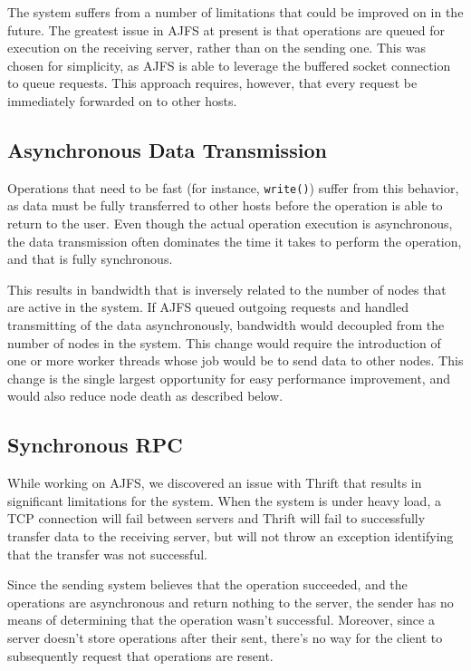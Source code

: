 
The system suffers from a number of limitations that could be improved on in the
future. The greatest issue in AJFS at present is that operations are queued for
execution on the receiving server, rather than on the sending one. This was
chosen for simplicity, as AJFS is able to leverage the buffered socket
connection to queue requests. This approach requires, however, that every
request be immediately forwarded on to other hosts.

\subsection{Asynchronous Data Transmission}

Operations that need to be fast (for instance, \texttt{write()}) suffer from
this behavior, as data must  be fully transferred to other hosts before the
operation is able to return to the user. Even though the actual operation
execution is asynchronous, the data transmission often dominates the time it
takes to perform the operation, and that is fully synchronous.

This results in bandwidth that is inversely related to the number of nodes
that are active in the system. If AJFS queued outgoing requests and handled
transmitting of the data asynchronously, bandwidth would decoupled from the 
number of nodes in the system. This change would require the introduction of one
or more worker threads whose job would be to send data to other nodes. This
change is the single largest opportunity for easy performance improvement, and
would also reduce node death as described below.

\subsection{Synchronous RPC}

While working on AJFS, we discovered an issue with Thrift that results in
significant limitations for the system. When the system is under heavy load, a
TCP connection will fail between servers and Thrift will fail to successfully
transfer data to the receiving server, but will not throw an exception
identifying that the transfer was not successful.

Since the sending system believes that the operation succeeded, and the
operations are asynchronous and return nothing to the server, the sender has no
means of determining that the operation wasn't successful. Moreover, since a
server doesn't store operations after their sent, there's no way for the client
to subsequently request that operations are resent.

